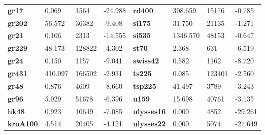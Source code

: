 \documentclass{article}
\begin{document}
\begin{table}[H]
\begin{tabular}{>{\bfseries}llll>{\bfseries}llll}
gr17 & 0.069 & 1564 & -24.988 & rd400 & 308.659 & 15176 & -0.785 \\
gr202 & 56.572 & 36382 & -9.408 & si175 & 31.750 & 21135 & -1.271 \\
gr21 & 0.106 & 2313 & -14.555 & si535 & 1346.570 & 48153 & -0.647 \\
gr229 & 48.173 & 128822 & -4.302 & st70 & 2.368 & 631 & -6.519 \\
gr24 & 0.150 & 1157 & -9.041 & swiss42 & 0.582 & 1162 & -8.720 \\
gr431 & 410.097 & 166502 & -2.931 & ts225 & 0.085 & 123401 & -2.560 \\
gr48 & 0.876 & 4609 & -8.660 & tsp225 & 41.497 & 3789 & -3.243 \\
gr96 & 5.929 & 51678 & -6.396 & u159 & 15.698 & 40761 & -3.135 \\
hk48 & 0.923 & 10649 & -7.085 & ulysses16 & 0.000 & 4852 & -29.261 \\
kroA100 & 4.514 & 20405 & -4.121 & ulysses22 & 0.000 & 5074 & -27.649 \\
\bottomrule
\end{tabular}

\end{table}
\end{document}
